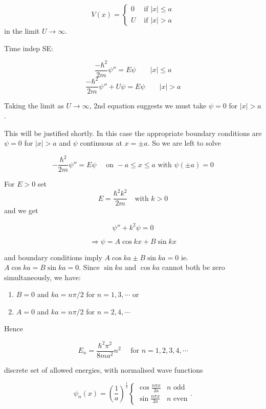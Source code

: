 \documentclass[a4paper]{article}
\begin{document}
\begin{eg}
	\begin{center}
	\end{center}
	
	\[ V(x) = \begin{cases} 0  & \text{ if } | x |  \leq a \\ U & \text{ if } | x | > a \end{cases} \] in the limit $ U \to \infty $.
	
	Time indep SE:
	
	\[ \frac{-\hbar^{2}}{2m} \psi''  = E \psi \qquad | x  | \leq a \]
	\[ \frac{-\hbar^{2}}{2m} \psi'' + U \psi = E \psi \qquad | x | > a \]
	
	Taking the limit as $ U  \to \infty $, 2nd equation suggests we must take $ \psi = 0 $ for $ | x | > a $.
	
	This will be justified shortly. In this case the appropriate boundary conditions are $ \psi = 0 $ for $ | x | > a $ and $ \psi $ continuous at $ x = \pm a $. So we are left to solve
	
	\[ - \frac{\hbar^{2}}{2m} \psi'' = E \psi \quad \text{ on } -a \leq x \leq a  \text{ with } \psi(\pm a) = 0 \]
	
	For $ E > 0 $ set \[  E = \frac{\hbar^{2} k^{2}}{2m}  \quad \text{with } k > 0 \] and we get
	
	\[ \psi'' + k^{2} \psi = 0 \]
	
	\[ \Rightarrow \psi = A \cos k x + B \sin k x \]
	
	and boundary conditions imply $ A \cos k a \pm B \sin k a  = 0 $ ie.  $ A \cos k a = B \sin k a  = 0 $.
	Since $ \sin ka $ and $ \cos ka $ cannot both be zero simultaneously, we have:
	
	
	\begin{enumerate}
		\item $ B = 0 $ and $ ka = n \pi / 2 $ for $ n = 1,3,\cdots $
		or 
		\item $ A = 0 $ and $ ka = n \pi / 2 $ for $ n = 2,4,\cdots $
		
	\end{enumerate}
	
	Hence
	
	\[ E_{n} = \frac{\hbar^{2}\pi^{2}}{8ma^{2}}n^{2} \quad \text{ for } n = 1,2,3,4,\cdots \]
	
	discrete set of allowed energies, with normalised wave functions
	
	\[
	\psi_n(x) = \left(\frac{1}{a}\right)^{\frac{1}{2}}
	\begin{cases}
	\cos \frac{n\pi x}{2a} & n\text{ odd}\\
	\sin \frac{n\pi x}{2a} & n\text{ even}
	\end{cases}.
	\]
\end{eg}
\end{document}
